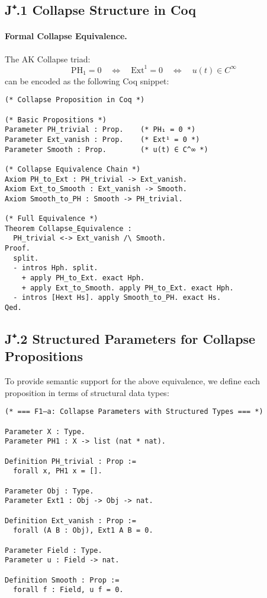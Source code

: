 \subsection*{J⁺.1 Collapse Structure in Coq}

\paragraph{Formal Collapse Equivalence.}

The AK Collapse triad:
\[
\mathrm{PH}_1 = 0 \quad \Leftrightarrow \quad \mathrm{Ext}^1 = 0 \quad \Leftrightarrow \quad u(t) \in C^\infty
\]
can be encoded as the following Coq snippet:

\begin{lstlisting}[language=Coq, caption=Collapse Structure in Coq Type Theory]
(* Collapse Proposition in Coq *)

(* Basic Propositions *)
Parameter PH_trivial : Prop.    (* PH₁ = 0 *)
Parameter Ext_vanish : Prop.    (* Ext¹ = 0 *)
Parameter Smooth : Prop.        (* u(t) ∈ C^∞ *)

(* Collapse Equivalence Chain *)
Axiom PH_to_Ext : PH_trivial -> Ext_vanish.
Axiom Ext_to_Smooth : Ext_vanish -> Smooth.
Axiom Smooth_to_PH : Smooth -> PH_trivial.

(* Full Equivalence *)
Theorem Collapse_Equivalence :
  PH_trivial <-> Ext_vanish /\ Smooth.
Proof.
  split.
  - intros Hph. split.
    + apply PH_to_Ext. exact Hph.
    + apply Ext_to_Smooth. apply PH_to_Ext. exact Hph.
  - intros [Hext Hs]. apply Smooth_to_PH. exact Hs.
Qed.
\end{lstlisting}

\subsection*{J⁺.2 Structured Parameters for Collapse Propositions}

To provide semantic support for the above equivalence,  
we define each proposition in terms of structural data types:

\begin{lstlisting}[language=Coq, caption=Structured Collapse Parameters in Coq]
(* === F1–a: Collapse Parameters with Structured Types === *)

Parameter X : Type.
Parameter PH1 : X -> list (nat * nat).

Definition PH_trivial : Prop :=
  forall x, PH1 x = [].

Parameter Obj : Type.
Parameter Ext1 : Obj -> Obj -> nat.

Definition Ext_vanish : Prop :=
  forall (A B : Obj), Ext1 A B = 0.

Parameter Field : Type.
Parameter u : Field -> nat.

Definition Smooth : Prop :=
  forall f : Field, u f = 0.
\end{lstlisting}

